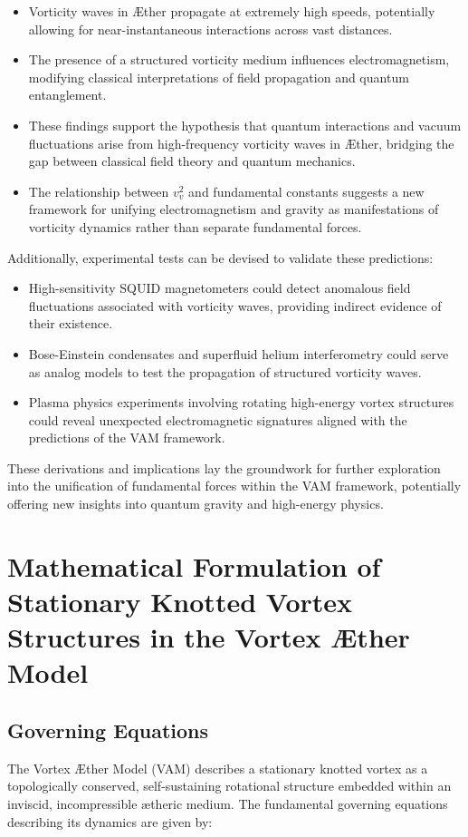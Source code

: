 \documentclass[a4paper,10pt]{article}
\begin{document}
\begin{itemize}
    \item Vorticity waves in Æther propagate at extremely high speeds, potentially allowing for near-instantaneous interactions across vast distances.
    \item The presence of a structured vorticity medium influences electromagnetism, modifying classical interpretations of field propagation and quantum entanglement.
    \item These findings support the hypothesis that quantum interactions and vacuum fluctuations arise from high-frequency vorticity waves in Æther, bridging the gap between classical field theory and quantum mechanics.
    \item The relationship between $v_v^2$ and fundamental constants suggests a new framework for unifying electromagnetism and gravity as manifestations of vorticity dynamics rather than separate fundamental forces.
\end{itemize}

Additionally, experimental tests can be devised to validate these predictions:
\begin{itemize}
    \item High-sensitivity SQUID magnetometers could detect anomalous field fluctuations associated with vorticity waves, providing indirect evidence of their existence.
    \item Bose-Einstein condensates and superfluid helium interferometry could serve as analog models to test the propagation of structured vorticity waves.
    \item Plasma physics experiments involving rotating high-energy vortex structures could reveal unexpected electromagnetic signatures aligned with the predictions of the VAM framework.
\end{itemize}

These derivations and implications lay the groundwork for further exploration into the unification of fundamental forces within the VAM framework, potentially offering new insights into quantum gravity and high-energy physics.

    
\section{Mathematical Formulation of Stationary Knotted Vortex Structures in the Vortex Æther Model}

\subsection{Governing Equations}
The Vortex Æther Model (VAM) describes a stationary knotted vortex as a topologically conserved, self-sustaining rotational structure embedded within an inviscid, incompressible ætheric medium. The fundamental governing equations describing its dynamics are given by:
\end{document}
